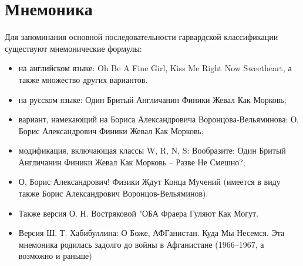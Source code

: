\documentclass[12pt,a4paper]{article}
\begin{document}
\section{Мнемоника}
Для запоминания основной последовательности гарвардской классификации существуют мнемонические формулы:

\begin{itemize}
\item на английском языке: Oh Be A Fine Girl, Kiss Me Right Now Sweetheart, а также множество других вариантов\cite{12}.
\item на русском языке: Один Бритый Англичанин Финики Жевал Как Морковь;
\item вариант, намекающий на Бориса Александровича Воронцова-Вельяминова: О, Борис Александрович Финики Жевал Как Морковь;
\item модификация, включающая классы W, R, N, S: Вообразите: Один Бритый Англичанин Финики Жевал Как Морковь -- Разве Не Смешно?;
\item О, Борис Александрович! Физики Ждут Конца Мучений (имеется в виду также Борис Александрович Воронцов-Вельяминов).
\item Также версия О. Н. Востряковой "ОБА Фраера Гуляют Как Могут.
\item Версия Ш. Т. Хабибуллина: О Боже, АФГанистан. Куда Мы Несемся. Эта мнемоника родилась задолго до войны в Афганистане (1966--1967, а возможно и раньше)
\end{itemize}
\end{document}
